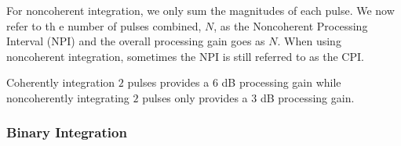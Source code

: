 For noncoherent integration, we only sum the magnitudes of each pulse. We now refer to th e number of pulses combined, $N$, as the Noncoherent Processing Interval (NPI) and the overall processing gain goes as $N$. When using noncoherent integration, sometimes the NPI is still referred to as the CPI.

Coherently integration $2$ pulses provides a $6$ dB processing gain while noncoherently integrating $2$ pulses only provides a $3$ dB processing gain.

\subsubsection{Binary Integration}
